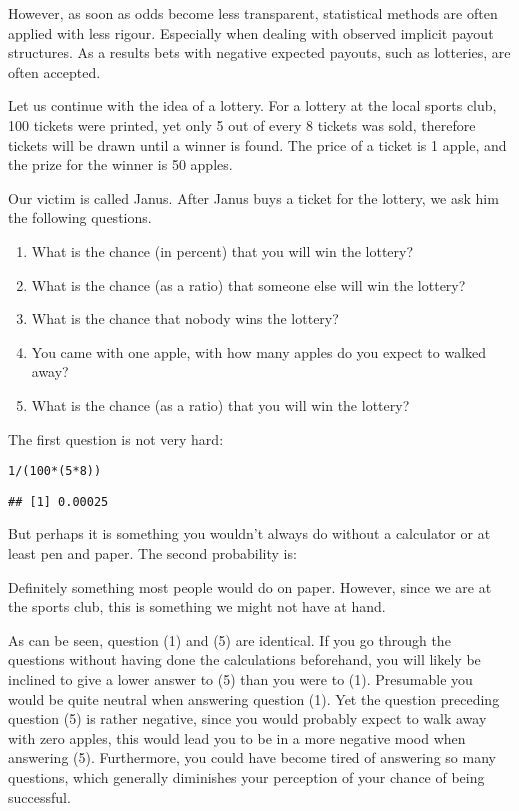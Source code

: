 \documentclass[a4paper]{book}\usepackage{graphicx, color}
\makeatletter
\newenvironment{kframe}{%
 \def\at@end@of@kframe{}%
 \ifinner\ifhmode%
  \def\at@end@of@kframe{\end{minipage}}%
  \begin{minipage}{\columnwidth}%
 \fi\fi%
 \def\FrameCommand##1{\hskip\@totalleftmargin \hskip-\fboxsep
 \colorbox{shadecolor}{##1}\hskip-\fboxsep
     \hskip-\linewidth \hskip-\@totalleftmargin \hskip\columnwidth}%
 \MakeFramed {\advance\hsize-\width
   \@totalleftmargin\z@ \linewidth\hsize
   \@setminipage}}%
 {\par\unskip\endMakeFramed%
 \at@end@of@kframe}
\newenvironment{knitrout}{}{} %
\makeatother
\begin{document}
However, as soon as odds become less transparent, statistical methods
are often applied with less rigour. Especially when dealing with
observed implicit payout structures. As a results bets with negative
expected payouts, such as lotteries, are often accepted.

Let us continue with the idea of a lottery. For a lottery at the local
sports club, 100 tickets were printed, yet only 5 out of every 8 tickets
was sold, therefore tickets will be drawn until a winner is found. The
price of a ticket is 1 apple, and the prize for the winner is 50 apples.

Our victim is called Janus. After Janus buys a ticket for the lottery,
we ask him the following questions.

\begin{enumerate}
\def\labelenumi{\arabic{enumi}.}
\itemsep1pt\parskip0pt
\item
  What is the chance (in percent) that you will win the lottery?
\item
  What is the chance (as a ratio) that someone else will win the
  lottery?
\item
  What is the chance that nobody wins the lottery?
\item
  You came with one apple, with how many apples do you expect to walked
  away?
\item
  What is the chance (as a ratio) that you will win the lottery?
\end{enumerate}

The first question is not very hard:

\begin{knitrout}
\color{fgcolor}\begin{kframe}
\begin{alltt}
1/(100 * (5 * 8))
\end{alltt}
\begin{verbatim}
## [1] 0.00025
\end{verbatim}
\end{kframe}
\end{knitrout}


But perhaps it is something you wouldn't always do without a calculator
or at least pen and paper. The second probability is:

Definitely something most people would do on paper. However, since we
are at the sports club, this is something we might not have at hand.

As can be seen, question (1) and (5) are identical. If you go through
the questions without having done the calculations beforehand, you will
likely be inclined to give a lower answer to (5) than you were to (1).
Presumable you would be quite neutral when answering question (1). Yet
the question preceding question (5) is rather negative, since you would
probably expect to walk away with zero apples, this would lead you to be
in a more negative mood when answering (5). Furthermore, you could have
become tired of answering so many questions, which generally diminishes
your perception of your chance of being successful.
\end{document}
